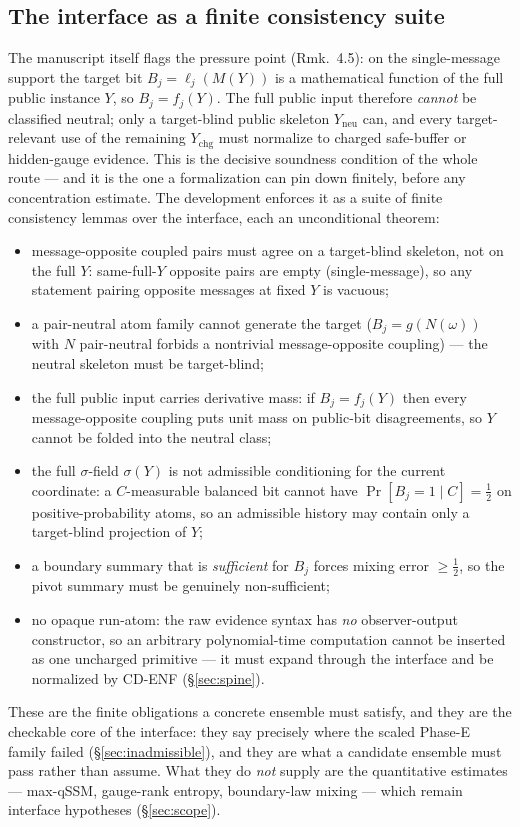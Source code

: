 \documentclass[11pt]{article}
\theoremstyle{definition}
\newcommand{\MY}{M(Y)}
\begin{document}
\subsection{The interface as a finite consistency suite}
\label{sec:interface}
The manuscript itself flags the pressure point (Rmk.~4.5): on the single-message
support the target bit $B_j=\ell_j(\MY)$ is a mathematical function of the full
public instance $Y$, so $B_j=f_j(Y)$. The full public input therefore
\emph{cannot} be classified neutral; only a target-blind public skeleton
$Y_{\mathrm{neu}}$ can, and every target-relevant use of the remaining
$Y_{\mathrm{chg}}$ must normalize to charged safe-buffer or hidden-gauge evidence.
This is the decisive soundness condition of the whole route --- and it is the one
a formalization can pin down finitely, before any concentration estimate. The
development enforces it as a suite of finite consistency lemmas over the interface,
each an unconditional theorem:
\begin{itemize}
  \item message-opposite coupled pairs must agree on a target-blind skeleton, not
        on the full $Y$: same-full-$Y$ opposite pairs are empty (single-message),
        so any statement pairing opposite messages at fixed $Y$ is vacuous;
  \item a pair-neutral atom family cannot generate the target
        ($B_j=g(N(\omega))$ with $N$ pair-neutral forbids a nontrivial
        message-opposite coupling) --- the neutral skeleton must be target-blind;
  \item the full public input carries derivative mass: if $B_j=f_j(Y)$ then every
        message-opposite coupling puts unit mass on public-bit disagreements, so
        $Y$ cannot be folded into the neutral class;
  \item the full $\sigma$-field $\sigma(Y)$ is not admissible conditioning for the
        current coordinate: a $C$-measurable balanced bit cannot have
        $\Pr[B_j=1\mid C]=\tfrac12$ on positive-probability atoms, so an
        admissible history may contain only a target-blind projection of $Y$;
  \item a boundary summary that is \emph{sufficient} for $B_j$ forces mixing error
        $\ge\tfrac12$, so the pivot summary must be genuinely non-sufficient;
  \item no opaque run-atom: the raw evidence syntax has \emph{no}
        observer-output constructor, so an arbitrary polynomial-time computation
        cannot be inserted as one uncharged primitive --- it must expand through
        the interface and be normalized by CD-ENF (\S\ref{sec:spine}).
\end{itemize}
These are the finite obligations a concrete ensemble must satisfy, and they are the
checkable core of the interface: they say precisely where the scaled Phase-E family
failed (\S\ref{sec:inadmissible}), and they are what a candidate ensemble must
pass rather than assume. What they do \emph{not} supply are the quantitative
estimates --- max-qSSM, gauge-rank entropy, boundary-law mixing --- which remain
interface hypotheses (\S\ref{sec:scope}).
\end{document}
